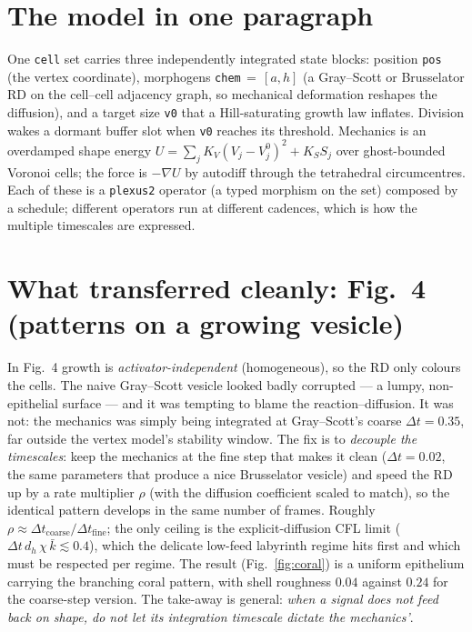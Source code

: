 \documentclass[11pt]{article}
\begin{document}
\section{The model in one paragraph}
One \texttt{cell} set carries three independently integrated state blocks: position \texttt{pos}
(the vertex coordinate), morphogens \texttt{chem}\,$=\,[a,h]$ (a Gray--Scott or Brusselator RD on
the cell--cell adjacency graph, so mechanical deformation reshapes the diffusion), and a target
size \texttt{v0} that a Hill-saturating growth law inflates. Division wakes a dormant buffer slot
when \texttt{v0} reaches its threshold. Mechanics is an overdamped shape energy
$U=\sum_j K_V(V_j-V_j^{0})^2 + K_S S_j$ over ghost-bounded Voronoi cells; the force is
$-\nabla U$ by autodiff through the tetrahedral circumcentres. Each of these is a \texttt{plexus2}
operator (a typed morphism on the set) composed by a schedule; different operators run at different
cadences, which is how the multiple timescales are expressed.

\section{What transferred cleanly: Fig.~4 (patterns on a growing vesicle)}
In Fig.~4 growth is \emph{activator-independent} (homogeneous), so the RD only colours the cells.
The naive Gray--Scott vesicle looked badly corrupted --- a lumpy, non-epithelial surface --- and it
was tempting to blame the reaction--diffusion. It was not: the mechanics was simply being integrated
at Gray--Scott's coarse $\Delta t\!=\!0.35$, far outside the vertex model's stability window. The fix
is to \emph{decouple the timescales}: keep the mechanics at the fine step that makes it clean
($\Delta t\!=\!0.02$, the same parameters that produce a nice Brusselator vesicle) and speed the RD
up by a rate multiplier $\rho$ (with the diffusion coefficient scaled to match), so the identical
pattern develops in the same number of frames. Roughly $\rho\!\approx\!\Delta t_{\text{coarse}}/
\Delta t_{\text{fine}}$; the only ceiling is the explicit-diffusion CFL limit
($\Delta t\,d_h\,\chi\,\bar{k}\lesssim 0.4$), which the delicate low-feed labyrinth regime hits first
and which must be respected per regime. The result (Fig.~\ref{fig:coral}) is a uniform epithelium
carrying the branching coral pattern, with shell roughness $0.04$ against $0.24$ for the coarse-step
version. The take-away is general: \emph{when a signal does not feed back on shape, do not let its
integration timescale dictate the mechanics'}.
\end{document}
